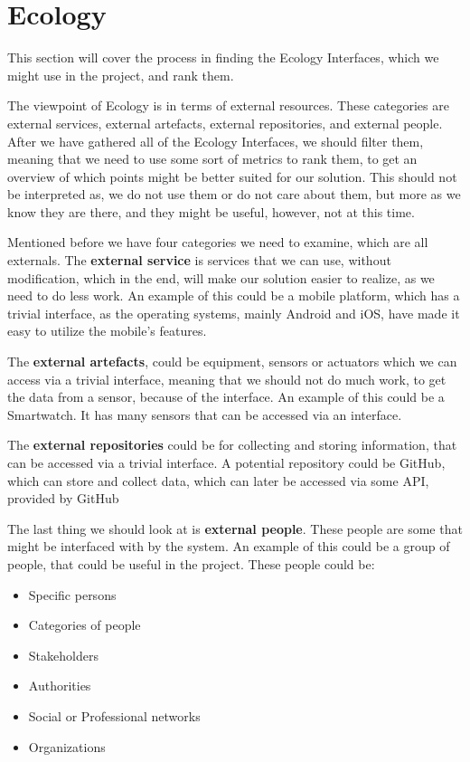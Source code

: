 \section{Ecology}\label{sec:ecology-interface}
This section will cover the process in finding the Ecology Interfaces, which we might use in the project, and rank them.

The viewpoint of Ecology is in terms of external resources.
These categories are external services, external artefacts, external repositories, and external people.
After we have gathered all of the Ecology Interfaces, we should filter them, meaning that we need to use some sort of metrics to rank them, to get an overview of which points might be better suited for our solution.
This should not be interpreted as, we do not use them or do not care about them, but more as we know they are there, and they might be useful, however, not at this time.

Mentioned before we have four categories we need to examine, which are all externals.
The \textbf{external service} is services that we can use, without modification, which in the end, will make our solution easier to realize, as we need to do less work.
An example of this could be a mobile platform, which has a trivial interface, as the operating systems, mainly Android and iOS, have made it easy to utilize the mobile's features.

The \textbf{external artefacts}, could be equipment, sensors or actuators which we can access via a trivial interface, meaning that we should not do much work, to get the data from a sensor, because of the interface.
An example of this could be a Smartwatch.
It has many sensors that can be accessed via an interface.

The \textbf{external repositories} could be for collecting and storing information, that can be accessed via a trivial interface.
A potential repository could be GitHub, which can store and collect data, which can later be accessed via some API, provided by GitHub 

The last thing we should look at is \textbf{external people}.
These people are some that might be interfaced with by the system.
An example of this could be a group of people, that could be useful in the project.
These people could be:
\begin{itemize}
    \item Specific persons
    \item Categories of people
    \item Stakeholders
    \item Authorities
    \item Social or Professional networks
    \item Organizations
\end{itemize}

